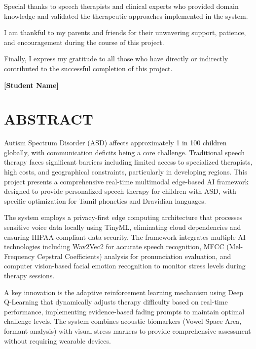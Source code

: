 \documentclass[12pt,a4paper]{article}
\begin{document}
Special thanks to speech therapists and clinical experts who provided domain knowledge and validated the therapeutic approaches implemented in the system.

I am thankful to my parents and friends for their unwavering support, patience, and encouragement during the course of this project.

Finally, I express my gratitude to all those who have directly or indirectly contributed to the successful completion of this project.

\vspace{2cm}

\begin{flushright}
\textbf{[Student Name]}
\end{flushright}

\newpage
\section*{ABSTRACT}

Autism Spectrum Disorder (ASD) affects approximately 1 in 100 children globally, with communication deficits being a core challenge. Traditional speech therapy faces significant barriers including limited access to specialized therapists, high costs, and geographical constraints, particularly in developing regions. This project presents a comprehensive real-time multimodal edge-based AI framework designed to provide personalized speech therapy for children with ASD, with specific optimization for Tamil phonetics and Dravidian languages.

The system employs a privacy-first edge computing architecture that processes sensitive voice data locally using TinyML, eliminating cloud dependencies and ensuring HIPAA-compliant data security. The framework integrates multiple AI technologies including Wav2Vec2 for accurate speech recognition, MFCC (Mel-Frequency Cepstral Coefficients) analysis for pronunciation evaluation, and computer vision-based facial emotion recognition to monitor stress levels during therapy sessions.

A key innovation is the adaptive reinforcement learning mechanism using Deep Q-Learning that dynamically adjusts therapy difficulty based on real-time performance, implementing evidence-based fading prompts to maintain optimal challenge levels. The system combines acoustic biomarkers (Vowel Space Area, formant analysis) with visual stress markers to provide comprehensive assessment without requiring wearable devices.
\end{document}
